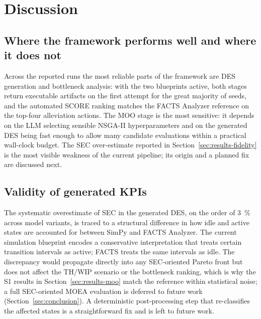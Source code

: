 \documentclass[a4paper,fleqn]{cas-sc}
\begin{document}
  \section{Discussion}\label{sec:discussion}                                                                            
                                                                                                                        
  \subsection{Where the framework performs well and where it does not}\label{sec:discussion-what}                       
                                                                                                                        
  Across the reported runs the most reliable parts of the framework are DES generation and bottleneck analysis: with the
   two blueprints active, both stages return executable artifacts on the first attempt for the great majority of seeds,
  and the automated SCORE ranking matches the FACTS Analyzer reference on the top-four alleviation actions. The MOO     
  stage is the most sensitive: it depends on the LLM selecting sensible NSGA-II hyperparameters and on the generated DES
   being fast enough to allow many candidate evaluations within a practical wall-clock budget. The SEC over-estimate
  reported in Section~\ref{sec:results-fidelity} is the most visible weakness of the current pipeline; its origin and a
  planned fix are discussed next.

  \subsection{Validity of generated KPIs}\label{sec:discussion-validity}                                                
  
  The systematic overestimate of SEC in the generated DES, on the order of 3~\% across model variants, is traced to a   
  structural difference in how idle and active states are accounted for between SimPy and FACTS Analyzer. The current
  simulation blueprint encodes a conservative interpretation that treats certain transition intervals as active; FACTS  
  treats the same intervals as idle. The discrepancy would propagate directly into any SEC-oriented Pareto front but does not affect the TH/WIP        
  scenario                                                                                                          
  or the bottleneck ranking, which is why the S1 results in Section~\ref{sec:results-moo} match the reference within
  statistical noise; a full SEC-oriented MOEA evaluation is deferred to future work (Section~\ref{sec:conclusion}). A deterministic
  post-processing step that re-classifies the affected states is a straightforward fix and is left to future work.
\end{document}
